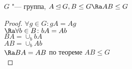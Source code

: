 \begin{conseq}
$G$ "--- группа, $A \unlhd G, B \le G \Ra AB \le G$ \\
\end{conseq}
\begin{proof}
$\forall g \in G\colon gA = Ag$\\
$\Ra \forall b \in B\colon bA = Ab$\\

$BA = \cup_b bA$\\
$AB = \cup_b Ab$\\
$\Ra BA = AB$ по теореме $AB \le G$\\
\end{proof}
